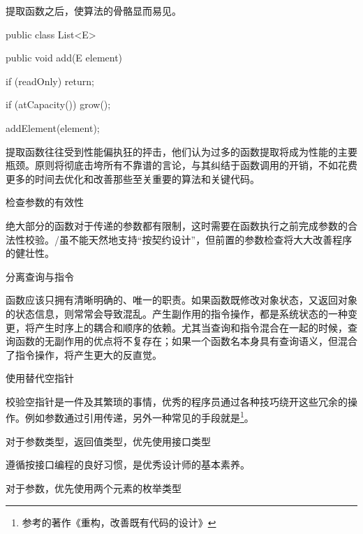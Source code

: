 \begin{content}
提取函数之后，使算法的骨骼显而易见。

\begin{leftbar}
\begin{java}[caption={java.util.List}]
public class List<E> {
   public void add(E element) {
      if (readOnly)
         return;
      
      if (atCapacity())
         grow();
      
      addElement(element);
   }
}
\end{java}
\end{leftbar}

提取函数往往受到性能偏执狂的抨击，他们认为过多的函数提取将成为性能的主要瓶颈。原则将彻底击垮所有不靠谱的言论，与其纠结于函数调用的开销，不如花费更多的时间去优化和改善那些至关重要的算法和关键代码。

\begin{regulation}
检查参数的有效性
\end{regulation}

绝大部分的函数对于传递的参数都有限制，这时需要在函数执行之前完成参数的合法性校验。\clang{}/\cpp{}虽不能天然地支持“按契约设计”，但前置的参数检查将大大改善程序的健壮性。

\begin{regulation}
分离查询与指令
\end{regulation}

函数应该只拥有清晰明确的、唯一的职责。如果函数既修改对象状态，又返回对象的状态信息，则常常会导致混乱。产生副作用的指令操作，都是系统状态的一种变更，将产生时序上的耦合和顺序的依赖。尤其当查询和指令混合在一起的时候，查询函数的无副作用的优点将不复存在；如果一个函数名本身具有查询语义，但混合了指令操作，将产生更大的反直觉。

\begin{regulation}
使用替代空指针
\end{regulation}

校验空指针是一件及其繁琐的事情，优秀的程序员通过各种技巧绕开这些冗余的操作。例如参数通过引用传递，另外一种常见的手段就是\footnote{参考的著作《重构，改善既有代码的设计》}。

\begin{regulation}
对于参数类型，返回值类型，优先使用接口类型
\end{regulation}

遵循按接口编程的良好习惯，是优秀设计师的基本素养。

\begin{regulation}
对于参数，优先使用两个元素的枚举类型
\end{regulation}


\end{content}
